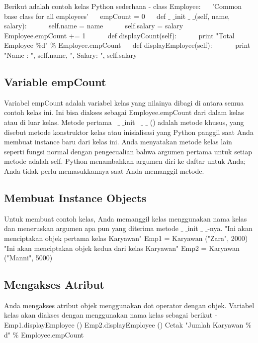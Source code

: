 Berikut adalah contoh kelas Python sederhana - 
\vspace{12pt}
class Employee: 
~~ 'Common base class for all employees' 
~~ empCount = 0 
\vspace{12pt}
~~ def  $  \_  $ $  \_  $init $  \_  $ $  \_  $(self, name, salary): 
~~~~~ self.name = name 
~~~~~ self.salary = salary 
~~~~~ Employee.empCount += 1 
~~~~~ def displayCount(self): 
~~~~~ print "Total Employee  $  \%  $d"  $  \%  $ Employee.empCount 
\vspace{12pt}
~~ def displayEmployee(self): 
\noindent 
~~~~~~print "Name : ", self.name,  ", Salary: ", self.salary 
\vspace{12pt}

\subsection{Variable empCount}
Variabel empCount adalah variabel kelas yang nilainya dibagi di antara semua contoh kelas ini. Ini bisa diakses sebagai Employee.empCount dari dalam kelas atau di luar kelas. Metode pertama  $  \_  $ $  \_  $init  $  \_  $ $  \_ $ () adalah metode khusus, yang disebut metode konstruktor kelas atau inisialisasi yang Python panggil saat Anda membuat instance baru dari kelas ini. Anda menyatakan metode kelas lain seperti fungsi normal dengan pengecualian bahwa argumen pertama untuk setiap metode adalah self. Python menambahkan argumen diri ke daftar untuk Anda; Anda tidak perlu memasukkannya saat Anda memanggil metode. 
\vspace{12pt}

\subsection{Membuat Instance Objects}
Untuk membuat contoh kelas, Anda memanggil kelas menggunakan nama kelas dan meneruskan argumen apa pun yang diterima metode  $  \_  $ $  \_  $init $  \_  $ $  \_  $-nya. 
\vspace{12pt}
"Ini akan menciptakan objek pertama kelas Karyawan" 
Emp1 = Karyawan ("Zara", 2000) 
"Ini akan menciptakan objek kedua dari kelas Karyawan" 
Emp2 = Karyawan ("Manni", 5000)
\vspace{12pt}
\noindent 

\subsection{Mengakses Atribut}
Anda mengakses atribut objek menggunakan dot operator dengan objek. Variabel kelas akan diakses dengan menggunakan nama kelas sebagai berikut - 
\vspace{12pt}
\noindent 
Emp1.displayEmployee () 
Emp2.displayEmployee ()
Cetak "Jumlah Karyawan $  \%  $ d" $  \%  $ Employee.empCount 
\vspace{12pt}
\noindent

